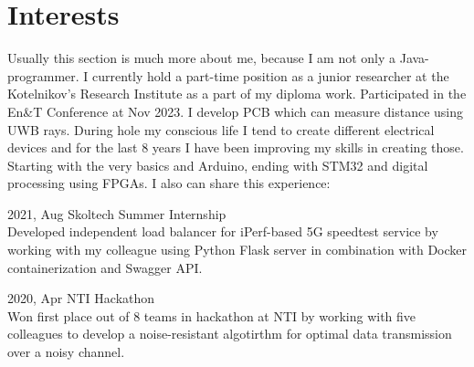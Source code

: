 \documentclass[]{cv-style}          %
\begin{document}


\section{Interests}
{\vspace{0.05cm}}
Usually this section is much more about me, because I am not only a Java-programmer. 
I currently hold a part-time position as a junior researcher at the Kotelnikov's Research Institute as a part of my diploma work. Participated in the En&T Conference at Nov 2023. I develop PCB which can measure distance using UWB rays. During hole my conscious life I tend to create different electrical devices and for the last 8 years I have been improving my skills in creating those. Starting with the very basics and Arduino, ending with STM32 and digital processing using FPGAs.
I also can share this experience:

\begin{entrylist}
\entrySkoltech
{2021, Aug}
{Skoltech Summer Internship}
{
\\
Developed independent load balancer for iPerf-based 5G speedtest service by working with my colleague using Python Flask server in combination with Docker containerization and Swagger API.
}



\entry
    {2020, Apr}
    {NTI Hackathon}
    {}
    {\\
Won first place out of 8 teams in hackathon at NTI by working with five colleagues to develop a noise-resistant algotirthm for optimal data transmission over a noisy channel.
    }

 \end{entrylist}


\end{document}
